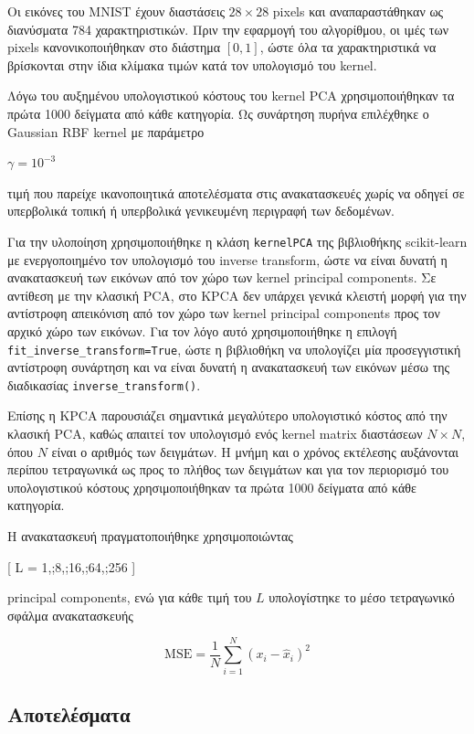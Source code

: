 \documentclass[12pt]{article}
\begin{document}
Οι εικόνες του MNIST έχουν διαστάσεις $28 \times 28$ pixels και αναπαραστάθηκαν ως διανύσματα 784 χαρακτηριστικών. Πριν την εφαρμογή του αλγορίθμου, οι 
ιμές των pixels κανονικοποιήθηκαν στο διάστημα $[0,1]$, ώστε όλα τα χαρακτηριστικά να βρίσκονται στην ίδια κλίμακα τιμών κατά τον υπολογισμό του kernel.

Λόγω του αυξημένου υπολογιστικού κόστους του kernel PCA χρησιμοποιήθηκαν τα πρώτα 1000 δείγματα από κάθε κατηγορία. Ως συνάρτηση πυρήνα επιλέχθηκε ο 
Gaussian RBF kernel με παράμετρο

$\gamma = 10^{-3}$

τιμή που παρείχε ικανοποιητικά αποτελέσματα στις ανακατασκευές χωρίς να οδηγεί σε υπερβολικά τοπική ή υπερβολικά γενικευμένη περιγραφή των δεδομένων.

Για την υλοποίηση χρησιμοποιήθηκε η κλάση \texttt{kernelPCA} της βιβλιοθήκης scikit-learn με ενεργοποιημένο τον υπολογισμό του inverse transform, ώστε 
να είναι δυνατή η ανακατασκευή των εικόνων από τον χώρο των kernel principal components. Σε αντίθεση με την κλασική PCA, στο KPCA δεν υπάρχει 
γενικά κλειστή μορφή για την αντίστροφη απεικόνιση από τον χώρο των kernel principal components προς τον αρχικό χώρο των εικόνων. Για τον λόγο αυτό 
χρησιμοποιήθηκε η επιλογή \texttt{fit\_inverse\_transform=True}, ώστε η βιβλιοθήκη να υπολογίζει μία προσεγγιστική αντίστροφη συνάρτηση και να είναι 
δυνατή η ανακατασκευή των εικόνων μέσω της διαδικασίας \texttt{inverse\_transform()}.

Επίσης η KPCA παρουσιάζει σημαντικά μεγαλύτερο υπολογιστικό κόστος από την κλασική PCA, καθώς απαιτεί τον υπολογισμό ενός kernel matrix διαστάσεων 
$N \times N$, όπου $N$ είναι ο αριθμός των δειγμάτων. Η μνήμη και ο χρόνος εκτέλεσης αυξάνονται περίπου τετραγωνικά ως προς το πλήθος των δειγμάτων και
για τον περιορισμό του υπολογιστικού κόστους χρησιμοποιήθηκαν τα πρώτα 1000 δείγματα από κάθε κατηγορία.

Η ανακατασκευή πραγματοποιήθηκε χρησιμοποιώντας

[
L = 1,;8,;16,;64,;256
]

principal components, ενώ για κάθε τιμή του $L$ υπολογίστηκε το μέσο τετραγωνικό σφάλμα ανακατασκευής

\begin{equation}
\mathrm{MSE}
=
\frac{1}{N}
\sum_{i=1}^{N}
(x_i-\hat{x}_i)^2
\end{equation}

\subsection{Αποτελέσματα}
\end{document}
